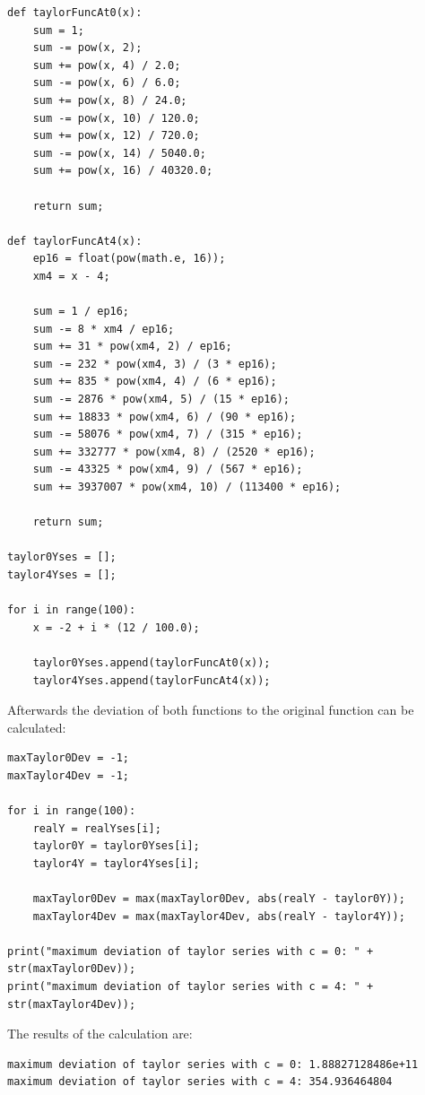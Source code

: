 \begin{lstlisting}[caption=Definition of the Taylor functions]
def taylorFuncAt0(x):
	sum = 1;
	sum -= pow(x, 2);
	sum += pow(x, 4) / 2.0;
	sum -= pow(x, 6) / 6.0;
	sum += pow(x, 8) / 24.0;
	sum -= pow(x, 10) / 120.0;
	sum += pow(x, 12) / 720.0;
	sum -= pow(x, 14) / 5040.0;
	sum += pow(x, 16) / 40320.0;
	
	return sum;

def taylorFuncAt4(x):
	ep16 = float(pow(math.e, 16));
	xm4 = x - 4;
	
	sum = 1 / ep16;
	sum -= 8 * xm4 / ep16;
	sum += 31 * pow(xm4, 2) / ep16;
	sum -= 232 * pow(xm4, 3) / (3 * ep16);
	sum += 835 * pow(xm4, 4) / (6 * ep16);
	sum -= 2876 * pow(xm4, 5) / (15 * ep16);
	sum += 18833 * pow(xm4, 6) / (90 * ep16);
	sum -= 58076 * pow(xm4, 7) / (315 * ep16);
	sum += 332777 * pow(xm4, 8) / (2520 * ep16);
	sum -= 43325 * pow(xm4, 9) / (567 * ep16);
	sum += 3937007 * pow(xm4, 10) / (113400 * ep16);
	
	return sum;

taylor0Yses = [];
taylor4Yses = [];

for i in range(100):
	x = -2 + i * (12 / 100.0);
	
	taylor0Yses.append(taylorFuncAt0(x));
	taylor4Yses.append(taylorFuncAt4(x));
\end{lstlisting}

Afterwards the deviation of both functions to the original function can be calculated:

\begin{lstlisting}[caption=Problem 5.9 d)]
maxTaylor0Dev = -1;
maxTaylor4Dev = -1;

for i in range(100):
	realY = realYses[i];
	taylor0Y = taylor0Yses[i];
	taylor4Y = taylor4Yses[i];
	
	maxTaylor0Dev = max(maxTaylor0Dev, abs(realY - taylor0Y));
	maxTaylor4Dev = max(maxTaylor4Dev, abs(realY - taylor4Y));

print("maximum deviation of taylor series with c = 0: " + str(maxTaylor0Dev));
print("maximum deviation of taylor series with c = 4: " + str(maxTaylor4Dev));
\end{lstlisting}

The results of the calculation are:

\begin{lstlisting}[caption=Result of 5.9 d), keywordstyle=\color{black}]
maximum deviation of taylor series with c = 0: 1.88827128486e+11
maximum deviation of taylor series with c = 4: 354.936464804
\end{lstlisting}

